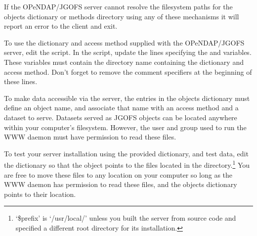 \documentclass{dods-book}
\begin{document}
If the OPeNDAP/JGOFS server cannot resolve the filesystem paths for the
objects dictionary or methods directory using any of these mechanisms
it will report an error to the client and exit.




To use the  dictionary and  access method
supplied with the OPeNDAP/JGOFS server, edit the 
script. In the  script, update the lines specifying the
 and  variables. These variables
must contain the directory name containing the 
dictionary and  access method. Don't forget to remove the
comment specifiers at the beginning of these lines.


 To
make data accessible via the server, the entries in the objects
dictionary must define an object name, and associate that name with an
access method and a dataset to serve. Datasets served as JGOFS objects
can be located anywhere within your computer's filesystem. However,
the user and group used to run the WWW daemon must have permission to
read these files.


To test your server installation using the provided dictionary, and
test data, edit the  dictionary so that the 
object points to the files located in the
directory.\footnote{`\$prefix' is `/usr/local/' unless you built the
  server from source code and specified a different root directory for
  its installation.} You are free to move these files to any location
on your computer so long as the WWW daemon has permission to read
these files, and the objects dictionary points to their location.
\end{document}
